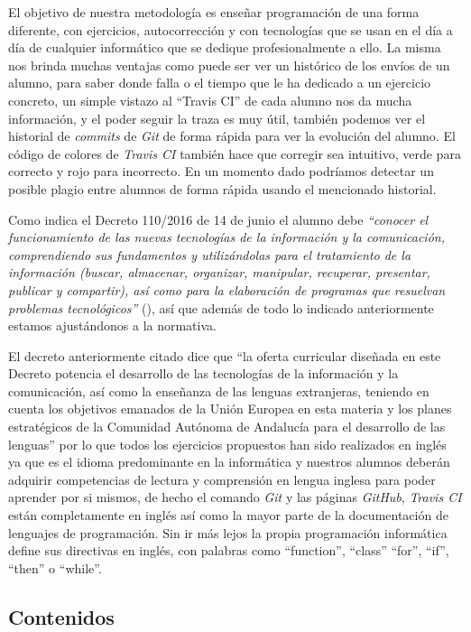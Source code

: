 \bigskip
El objetivo de nuestra metodología es enseñar programación de una forma diferente, con ejercicios, autocorrección y con tecnologías que se usan en el día a día de cualquier informático que se dedique profesionalmente a ello. La misma nos brinda muchas ventajas como puede ser ver un histórico de los envíos de un alumno, para saber donde falla o el tiempo que le ha dedicado a un ejercicio concreto, un simple vistazo al ``Travis CI'' de cada alumno nos da mucha información, y el poder seguir la traza es muy útil, también podemos ver el historial de \textit{commits} de \textit{Git} de forma rápida para ver la evolución del alumno. El código de colores de \textit{Travis CI} también hace que corregir sea intuitivo, verde para correcto y rojo para incorrecto. En un momento dado podríamos detectar un posible plagio entre alumnos de forma rápida usando el mencionado historial.

\bigskip
Como indica el Decreto 110/2016  de 14 de junio el alumno debe \textit{``conocer el funcionamiento de las nuevas tecnologías de la información y la comunicación, comprendiendo sus fundamentos y utilizándolas para el tratamiento de la información (buscar, almacenar, organizar, manipular, recuperar, presentar, publicar y compartir), así como para la elaboración de programas que resuelvan problemas tecnológicos''} (\cite{junta_de_andalucia_decreto_2016}), así que además de todo lo indicado anteriormente estamos ajustándonos a la normativa.

\bigskip
El decreto anteriormente citado dice que ``la oferta curricular diseñada en este Decreto potencia el desarrollo de las tecnologías de la información y la comunicación, así como la enseñanza de las lenguas extranjeras, teniendo en cuenta los objetivos emanados de la Unión Europea en esta materia y los planes estratégicos de la Comunidad Autónoma de Andalucía para el desarrollo de las lenguas'' por lo que todos los ejercicios propuestos han sido realizados en inglés ya que es el idioma predominante en la informática y nuestros alumnos deberán adquirir competencias de lectura y comprensión en lengua inglesa para poder aprender por si mismos, de hecho el comando \textit{Git} y las páginas \textit{GitHub}, \textit{Travis CI} están completamente en inglés así como la mayor parte de la documentación de lenguajes de programación. Sin ir más lejos la propia programación informática define sus directivas en inglés, con palabras como ``function'', ``class'' ``for'', ``if'', ``then'' o ``while''.

\subsection{Contenidos}

